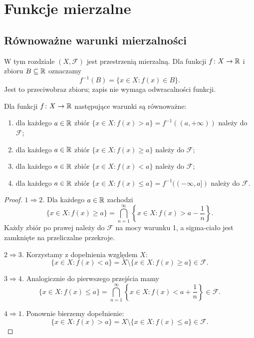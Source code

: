 \chapter{Funkcje mierzalne}
\label{chap:funkcje-mierzalne}

\section{Równoważne warunki mierzalności}
\label{sec:warunki-mierzalnosci-funkcji}

W tym rozdziale $(X,\mathcal{F})$ jest przestrzenią mierzalną.
Dla funkcji $f\colon X\to\mathbb{R}$ i zbioru $B\subseteq\mathbb{R}$ oznaczamy
\[
  f^{-1}(B)=\{x\in X:f(x)\in B\}.
\]
Jest to przeciwobraz zbioru; zapis nie wymaga odwracalności funkcji.

\begin{twierdzenie}
\label{tw:warunki-mierzalnosci-funkcji}
Dla funkcji $f\colon X\to\mathbb{R}$ następujące warunki są równoważne:
\begin{enumerate}
  \item dla każdego $a\in\mathbb{R}$ zbiór
    $\{x\in X:f(x)>a\}=f^{-1}((a,+\infty))$ należy do $\mathcal{F}$;
  \item dla każdego $a\in\mathbb{R}$ zbiór
    $\{x\in X:f(x)\geq a\}$ należy do $\mathcal{F}$;
  \item dla każdego $a\in\mathbb{R}$ zbiór
    $\{x\in X:f(x)<a\}$ należy do $\mathcal{F}$;
  \item dla każdego $a\in\mathbb{R}$ zbiór
    $\{x\in X:f(x)\leq a\}=f^{-1}((-\infty,a])$ należy do $\mathcal{F}$.
\end{enumerate}
\end{twierdzenie}

\begin{proof}
\emph{$1\Rightarrow2$.} Dla każdego $a\in\mathbb{R}$ zachodzi
\[
  \{x\in X:f(x)\geq a\}
  =\bigcap_{n=1}^{\infty}\left\{x\in X:f(x)>a-\frac1n\right\}.
\]
Każdy zbiór po prawej należy do $\mathcal{F}$ na mocy warunku 1,
a sigma-ciało jest zamknięte na przeliczalne przekroje.

\emph{$2\Rightarrow3$.} Korzystamy z dopełnienia względem $X$:
\[
  \{x\in X:f(x)<a\}
  =X\setminus\{x\in X:f(x)\geq a\}\in\mathcal{F}.
\]

\emph{$3\Rightarrow4$.} Analogicznie do pierwszego przejścia mamy
\[
  \{x\in X:f(x)\leq a\}
  =\bigcap_{n=1}^{\infty}\left\{x\in X:f(x)<a+\frac1n\right\}
  \in\mathcal{F}.
\]

\emph{$4\Rightarrow1$.} Ponownie bierzemy dopełnienie:
\[
  \{x\in X:f(x)>a\}
  =X\setminus\{x\in X:f(x)\leq a\}\in\mathcal{F}.
\]
\end{proof}

